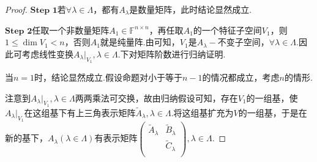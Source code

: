\documentclass[../../main.tex]{subfiles}%
\begin{document}
\begin{proof}

$\mathbf{Step}\,\,\mathbf{1}$若$\forall \lambda \in \Lambda$，都有$A_{\lambda}$是数量矩阵，此时结论显然成立.

$\mathbf{Step}\,\,\mathbf{2}$任取一个非数量矩阵$A_1\in \mathbb{F} ^{n\times n}$，再任取$A_1$的一个特征子空间$V_1$，则$1\leqslant \dim V_1<n$，否则$A_1$就是纯量阵.由可知，$V_1$是$A_{\lambda}-$不变子空间，$\forall \lambda \in \Lambda$.因此可考虑线性变换$A_{\lambda}|_{V_1},\lambda \in \Lambda$.下对矩阵阶数进行归纳证明.

当$n=1$时，结论显然成立.假设命题对小于等于$n - 1$的情况都成立，考虑$n$的情形.

注意到$A_{\lambda}|_{V_1},\lambda \in \Lambda$两两乘法可交换，故由归纳假设可知，存在$V_1$的一组基，使$A_{\lambda}|_{V_1}$在这组基下有上三角表示矩阵$\widetilde{A}_{\lambda},\lambda \in \Lambda$.将这组基扩充为$V$的一组基，于是在新的基下，$A_{\lambda}\left( \lambda \in \Lambda \right)$有表示矩阵$\begin{pmatrix}
\widetilde{A}_{\lambda}&		\widetilde{B}_{\lambda}\\
&		\widetilde{C}_{\lambda}\\
\end{pmatrix},\lambda \in \Lambda$.


\end{proof}
\end{document}
